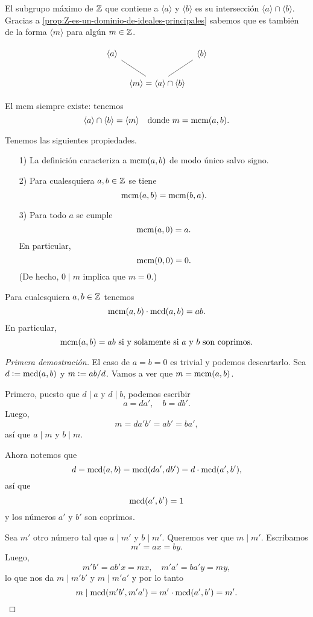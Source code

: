 \documentclass{article}
\numberwithin{equation}{section}
\begin{document}
El subgrupo máximo de $\mathbb{Z}$ que contiene a $\langle a\rangle$ y
$\langle b\rangle$ es su intersección $\langle a\rangle \cap \langle
b\rangle$. Gracias a \ref{prop:Z-es-un-dominio-de-ideales-principales} sabemos
que es también de la forma $\langle m\rangle$ para algún $m\in \mathbb{Z}$.

\[ \begin{tikzcd}[column sep=0.5em]
    \langle a\rangle & & \langle b\rangle \\
    & \langle m\rangle = \langle a\rangle \cap \langle b\rangle\ar[-]{ul}\ar[-]{ur}
  \end{tikzcd} \]

\begin{proposicion}
  El mcm siempre existe: tenemos
  $$\langle a\rangle \cap \langle b\rangle = \langle m\rangle \quad \text{donde } m = \operatorname{mcm} (a,b).$$
\end{proposicion}

Tenemos las siguientes propiedades.

\begin{enumerate}
\item[1)] La definición caracteriza a $\operatorname{mcm} (a,b)$ de modo único salvo signo.

\item[2)] Para cualesquiera $a,b\in\mathbb{Z}$ se tiene
$$\operatorname{mcm} (a,b) = \operatorname{mcm} (b,a).$$

\item[3)] Para todo $a$ se cumple
  $$\operatorname{mcm} (a,0) = a.$$
  En particular,
  $$\operatorname{mcm} (0,0) = 0.$$
  (De hecho, $0 \mid m$ implica que $m = 0$.)
\end{enumerate}

\begin{proposicion}
  Para cualesquiera $a,b\in\mathbb{Z}$ tenemos
  $$\operatorname{mcm} (a,b)\cdot \operatorname{mcd} (a,b) = ab.$$
  En particular,
  $$\operatorname{mcm} (a,b) = ab\text{ si y solamente si }a\text{ y }b\text{ son coprimos}.$$
\end{proposicion}

\begin{proof}[Primera demostración]
  El caso de $a = b = 0$ es trivial y podemos descartarlo. Sea
  $d \mathrel{\mathop:}= \operatorname{mcd} (a,b)$ y $m \mathrel{\mathop:}= ab/d$. Vamos a ver que $m = \operatorname{mcm} (a,b)$.

  Primero, puesto que $d\mid a$ y $d\mid b$, podemos escribir
  $$a = d a',\quad b = d b'.$$
  Luego,
  $$m = d a' b' = a b' = b a',$$
  así que $a \mid m$ y $b \mid m$.

  Ahora notemos que
  $$d = \operatorname{mcd} (a,b) = \operatorname{mcd} (da', db') = d\cdot \operatorname{mcd} (a', b'),$$
  así que
  $$\operatorname{mcd} (a', b') = 1$$
  y los números $a'$ y $b'$ son coprimos.

  Sea $m'$ otro número tal que $a\mid m'$ y $b\mid m'$. Queremos ver que
  $m\mid m'$. Escribamos
  $$m' = ax = by.$$
  Luego,
  $$m' b' = a b' x = mx, \quad m' a' = b a' y = my,$$
  lo que nos da $m\mid m' b'$ y $m \mid m' a'$ y por lo tanto
  $$m \mid \operatorname{mcd} (m' b', m' a') = m'\cdot \operatorname{mcd} (a', b') = m'.$$
\end{proof}
\end{document}
